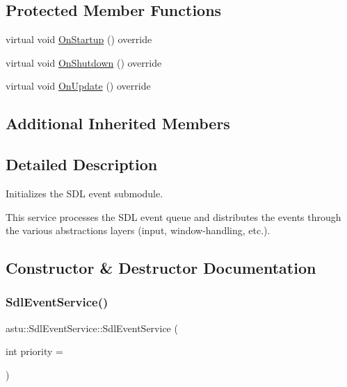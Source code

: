 \subsection*{Protected Member Functions}
\begin{DoxyCompactItemize}
\item 
virtual void \hyperlink{classastu_1_1SdlEventService_a71805a124600a23e48158daa5dc57fff}{On\+Startup} () override
\item 
virtual void \hyperlink{classastu_1_1SdlEventService_a0163bd191605b5068d93cd6c8f26da0c}{On\+Shutdown} () override
\item 
virtual void \hyperlink{classastu_1_1SdlEventService_a67090f42250433506b8bfb4254df9e50}{On\+Update} () override
\end{DoxyCompactItemize}
\subsection*{Additional Inherited Members}


\subsection{Detailed Description}
Initializes the S\+DL event submodule.

This service processes the S\+DL event queue and distributes the events through the various abstractions layers (input, window-\/handling, etc.). 

\subsection{Constructor \& Destructor Documentation}
\mbox{\label{classastu_1_1SdlEventService_ad8da3cc63eb9810ba27a80bfeb68122d}} 
\subsubsection{\texorpdfstring{Sdl\+Event\+Service()}{SdlEventService()}}
{\footnotesize\ttfamily astu\+::\+Sdl\+Event\+Service\+::\+Sdl\+Event\+Service (\begin{DoxyParamCaption}\item[{int}]{priority = {} }\end{DoxyParamCaption})}

